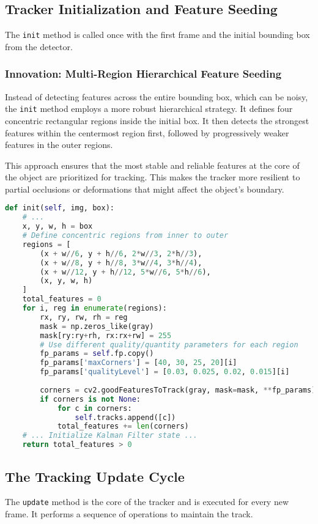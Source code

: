 \documentclass[12pt, a4paper]{article}
\begin{document}
\subsection{Tracker Initialization and Feature Seeding}
The \texttt{init} method is called once with the first frame and the initial bounding box from the detector.

\subsubsection{Innovation: Multi-Region Hierarchical Feature Seeding}
Instead of detecting features across the entire bounding box, which can be noisy, the \texttt{init} method employs a more robust hierarchical strategy. It defines four concentric rectangular regions inside the initial box. It then detects the strongest features within the centermost region first, followed by progressively weaker features in the outer regions.

This approach ensures that the most stable and reliable features at the core of the object are prioritized for tracking. This makes the tracker more resilient to partial occlusions or deformations that might affect the object's boundary.

\begin{lstlisting}[language=Python, caption={Hierarchical feature seeding in the init method.}, label={lst:init_features}]
def init(self, img, box):
    # ...
    x, y, w, h = box
    # Define concentric regions from inner to outer
    regions = [
        (x + w//6, y + h//6, 2*w//3, 2*h//3),
        (x + w//8, y + h//8, 3*w//4, 3*h//4),
        (x + w//12, y + h//12, 5*w//6, 5*h//6),
        (x, y, w, h)
    ]
    total_features = 0
    for i, reg in enumerate(regions):
        rx, ry, rw, rh = reg
        mask = np.zeros_like(gray)
        mask[ry:ry+rh, rx:rx+rw] = 255
        # Use different quality/quantity parameters for each region
        fp_params = self.fp.copy()
        fp_params['maxCorners'] = [40, 30, 25, 20][i]
        fp_params['qualityLevel'] = [0.03, 0.025, 0.02, 0.015][i]
        
        corners = cv2.goodFeaturesToTrack(gray, mask=mask, **fp_params)
        if corners is not None:
            for c in corners:
                self.tracks.append([c])
            total_features += len(corners)
    # ... Initialize Kalman Filter state ...
    return total_features > 0
\end{lstlisting}

\subsection{The Tracking Update Cycle}
The \texttt{update} method is the core of the tracker and is executed for every new frame. It performs a sequence of operations to maintain the track.
\end{document}
